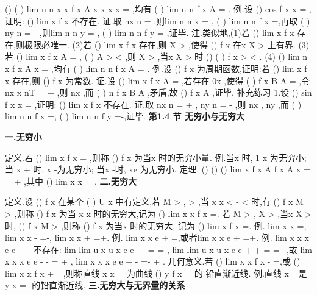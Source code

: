 ()
(
)
lim
n
n
x
x f x
A
x
x
x
x
\to 
=
\Leftrightarrow \forall 
\to 
\neq 
,均有
(
)
lim
n
n
f x
A
\to \infty 
=
. 
\textcolor{lyred}{例}.设
()
cos
f x
x
=
,证明:
()
lim
x
f x
\to 
不存在. 
证.取
nx
n\pi 
=
,则lim
n
n
x
\to \infty 
=
,
(
)
lim
n
n
f x
\to \infty 
=,再取
(
)
ny
n
\pi 
=
-
,则lim
n
n
y
\to \infty 
=
, 
(
)
lim
n
n
f
y
\to \infty 
=-,证毕. 
\textcolor{lyred}{注}.类似地,(1)若
()
lim
x
f x
\to \infty 
存在,则极限必唯一. 
(2)若
()
lim
x
f x
\to \infty 
存在,则
X
\exists 
>
,使得
()
f x 在x
X
>
上有界. 
(3)若
()
lim
x
f x
A
\to \infty 
=
,
(
)
A >
<
,则
X
\exists 
>
,当x
X
>
时
()
(
)
f x >
<
. 
(4)
()
lim
n
x
f x
A
x
\to \infty 
=
\Leftrightarrow \forall 
\to \infty ,均有
(
)
lim
n
n
f x
A
\to \infty 
=
. 
\textcolor{lyred}{例}.设
()
f x 为周期函数,证明:若
()
lim
x
f x
\to \infty 
存在,则
()
f x 为常数. 
证.设
()
lim
x
f x
A
\to \infty 
=
,若存在
0x ,使得
(
)
f x
B
A
=
\neq 
,令
nx
x
nT
=
+
,则 
nx \to \infty ,而
(
)
n
f x
B
A
\to 
\neq 
,矛盾,故
()
f x
A
\equiv 
,证毕. 
\textcolor{lyred}{补充练习 }
1.设
()
sin
f x
x
=
,证明:
()
lim
x
f x
\to \infty 
不存在. 
证.取
nx
n
\pi 
\pi 
=
+
,
ny
n
\pi 
\pi 
=
-
,则
nx \to \infty ,
ny \to \infty ,而 
(
)
lim
n
n
f x
\to \infty 
=,
(
)
lim
n
n
f
y
\to \infty 
=-,证毕. 
\vspace{6pt}
{\large \bfseries \textcolor{lyred}{第1.4 节 无穷小与无穷大}}

\vspace{4pt}
{\bfseries \textcolor{lyred}{一.无穷小}}

\textcolor{lyred}{定义}.若
()
lim
x
f x
\to 
=
\Omega 
,则称
()
f x 为当x \to \Omega 时的\textcolor{lyred}{无穷小量}. 
\textcolor{lyred}{例}.当x \to \infty 时, 1
x 为无穷小;当
x
+
\to 
时,
x -为无穷小; 
当x \to -\infty 时,
xe 为无穷小. 
\textcolor{lyred}{定理}.
()
()
()
lim
x
f x
A
f x
A
x
\alpha 
\to 
=
\Leftrightarrow 
=
+
\Omega 
,其中
()
lim
x
x
\alpha 
\to 
=
\Omega 
. 
\vspace{4pt}
{\bfseries \textcolor{lyred}{二.无穷大}}

\textcolor{lyred}{定义}.设
()
f x 在某个
(
)
U x
\circ 
中有定义,若
M
\forall 
>
,
\delta 
\exists 
>
,当
x
x
\delta 
<
-
<
时,有 
()
f x
M
>
,则称
()
f x 为当
x
x
\to 
时的\textcolor{lyred}{无穷大},记为
()
lim
x
x f x
\to 
=\infty . 
若
M
\forall 
>
,
X
\exists 
>
,当x
X
>
时,
()
f x
M
>
,则称
()
f x 为当x \to \infty 时的\textcolor{lyred}{无穷大}, 
记为
()
lim
x
f x
\to \infty 
=\infty . 
\textcolor{lyred}{例}.
lim
x
x
\to 
=\infty ,
lim
x
x
-
\to 
=-\infty ,
lim
x
x
+
\to 
=+\infty . 
\textcolor{lyred}{例}. lim
x
x
e
\to +\infty 
=\infty ,或者lim
x
x
e
\to +\infty 
=+\infty . 
\textcolor{lyred}{例}.
lim
x
x
x
e
e
\to 
-
+
不存在:
lim
lim
u
x
u
x
e
e
-
\to -\infty 
\to 
=
=
,
lim
lim
u
x
u
x
e
e
+
\to +\infty 
\to 
=
=+\infty ,故 
lim
x
x
x
e
e
-
\to 
-
=
+
,
lim
x
x
x
e
e
+
\to 
-
=-
+
. 
\textcolor{lyred}{几何意义}.若
()
lim
x
x f x
-
\to 
=\infty ,或
()
lim
x
x f x
+
\to 
=\infty ,则称直线
x
x
=
为曲线
()
y
f x
=
的 
\textcolor{lyred}{铅直渐近线}. 
\textcolor{lyred}{例}.直线
x =是
y
x
=
-的铅直渐近线. 
\vspace{4pt}
{\bfseries \textcolor{lyred}{三.无穷大与无界量的关系}}

